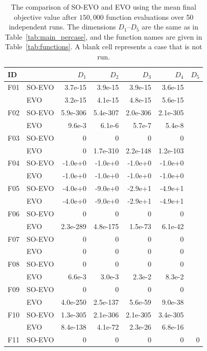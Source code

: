 \begin{table}[htbp]
\centering\footnotesize
\caption{The comparison of SO-EVO and EVO using the mean final objective value after $150{,}000$ function evaluations over 50 independent runs. The dimensions $D_1$--$D_5$ are the same as in Table~\ref{tab:main_percase}, and the function names are given in Table~\ref{tab:functions}. A blank cell represents a case that is not run.}
\label{tab:fixedfe_percase}
\begin{tabular}{llrrrrr}
\toprule
ID & & $D_1$ & $D_2$ & $D_3$ & $D_4$ & $D_5$ \\
\midrule
F01 & SO-EVO & 3.7e{-}15 & 3.9e{-}15 & 3.9e{-}15 & 3.6e{-}15 &  \\
 & EVO & 3.2e{-}15 & 4.1e{-}15 & 4.8e{-}15 & 5.6e{-}15 &  \\[2pt]
F02 & SO-EVO & 5.9e{-}306 & 5.4e{-}307 & 2.0e{-}306 & 2.1e{-}305 &  \\
 & EVO & 9.6e{-}3 & 6.1e{-}6 & 5.7e{-}7 & 5.4e{-}8 &  \\[2pt]
F03 & SO-EVO & 0 & 0 & 0 & 0 &  \\
 & EVO & 0 & 1.7e{-}310 & 2.2e{-}148 & 1.2e{-}103 &  \\[2pt]
F04 & SO-EVO & -1.0e{+}0 & -1.0e{+}0 & -1.0e{+}0 & -1.0e{+}0 &  \\
 & EVO & -1.0e{+}0 & -1.0e{+}0 & -1.0e{+}0 & -1.0e{+}0 &  \\[2pt]
F05 & SO-EVO & -4.0e{+}0 & -9.0e{+}0 & -2.9e{+}1 & -4.9e{+}1 &  \\
 & EVO & -4.0e{+}0 & -9.0e{+}0 & -2.9e{+}1 & -4.9e{+}1 &  \\[2pt]
F06 & SO-EVO & 0 & 0 & 0 & 0 &  \\
 & EVO & 2.3e{-}289 & 4.8e{-}175 & 1.5e{-}73 & 6.1e{-}42 &  \\[2pt]
F07 & SO-EVO & 0 & 0 & 0 & 0 &  \\
 & EVO & 0 & 0 & 0 & 0 &  \\[2pt]
F08 & SO-EVO & 0 & 0 & 0 & 0 &  \\
 & EVO & 6.6e{-}3 & 3.0e{-}3 & 2.3e{-}2 & 8.3e{-}2 &  \\[2pt]
F09 & SO-EVO & 0 & 0 & 0 & 0 &  \\
 & EVO & 4.0e{-}250 & 2.5e{-}137 & 5.6e{-}59 & 9.0e{-}38 &  \\[2pt]
F10 & SO-EVO & 1.3e{-}305 & 2.1e{-}306 & 2.1e{-}305 & 3.4e{-}305 &  \\
 & EVO & 8.4e{-}138 & 4.1e{-}72 & 2.3e{-}26 & 6.8e{-}16 &  \\[2pt]
F11 & SO-EVO & 0 & 0 & 0 & 0 & 0 \\

\end{tabular}
\end{table}
